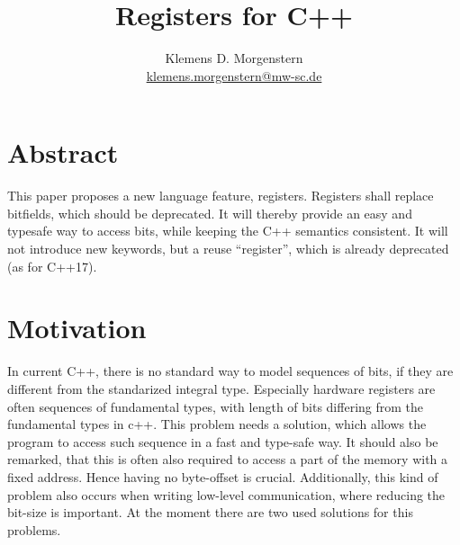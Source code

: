 \documentclass{scrreprt}
\begin{document}
\title{Registers for C++}
\author{Klemens D. Morgenstern
\\\href{mailto:klemens.morgenstern@mw-sc.de}{klemens.morgenstern@mw-sc.de}}

\thispagestyle{empty}
\begingroup
\def\hd{\begin{tabular}{ll}
          \textbf{Document Number:} & {\larger\docno}             \\
          \textbf{Date:}            & \today                      \\
          \textbf{Revises:}         & \prevdocno                  \\
          \textbf{Reply to:}        & Klemens D. Morgenstern      \\
                                    & klemens.morgenstern@gmx.net
          \end{tabular}
}

\newpage


\tableofcontents

\chapter*{Abstract}
 This paper proposes a new language feature, registers. Registers shall replace
bitfields, which should be deprecated. It will thereby provide an easy and
typesafe way to access bits, while keeping the C++ semantics
consistent. It will not introduce new keywords, but a reuse 
``register'', which is already deprecated (as for C++17).

\chapter{Motivation}
In current C++, there is no standard way to model sequences of bits, if they
are different from the standarized integral type. Especially hardware
registers are often sequences of fundamental types, with length of bits
differing from the fundamental types in c++.
This problem needs a solution, which allows the program to
access such sequence in a fast and type-safe way. 
It should also be remarked, that this is often also required to access a
part of the memory with a fixed address. Hence having no byte-offset is crucial.
Additionally, this kind of problem also occurs when writing low-level
communication, where reducing the bit-size is important.
At the moment there are two used solutions for this problems.
\end{document}
